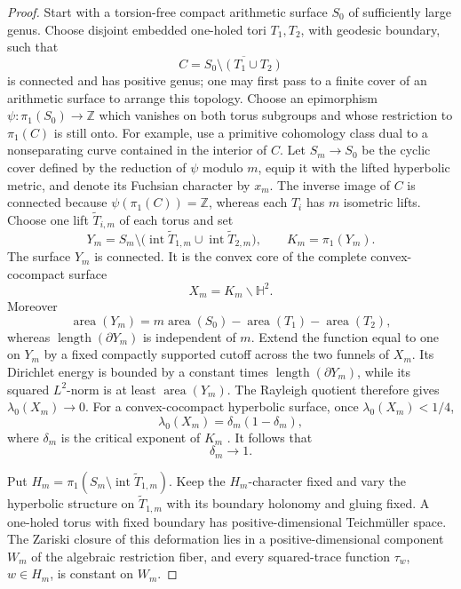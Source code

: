 \documentclass[11pt,reqno]{amsart}
\theoremstyle{definition}
\theoremstyle{remark}
\newcommand{\Z}{\mathbb Z}
\begin{document}
\begin{proof}
Start with a torsion-free compact arithmetic surface \(S_0\) of sufficiently
large genus.  Choose disjoint embedded one-holed tori \(T_1,T_2\), with
geodesic boundary, such that
\[
 C=\overline{S_0\setminus(T_1\cup T_2)}
\]
is connected and has positive genus; one may first pass to a finite cover of
an arithmetic surface to arrange this topology.  Choose an epimorphism
\(\psi\colon\pi_1(S_0)\to\Z\) which vanishes on both torus subgroups and whose
restriction to \(\pi_1(C)\) is still onto.  For example, use a primitive
cohomology class dual to a nonseparating curve contained in the interior of
\(C\).  Let \(S_m\to S_0\) be the cyclic cover defined by the reduction of
\(\psi\) modulo \(m\), equip it with the lifted hyperbolic metric, and denote
its Fuchsian character by \(x_m\).  The inverse image of \(C\) is connected because
\(\psi(\pi_1(C))=\Z\), whereas each \(T_i\) has \(m\) isometric lifts.  Choose
one lift \(\widetilde T_{i,m}\) of each torus and set
\[
 Y_m=S_m\setminus\bigl(\operatorname{int}\widetilde T_{1,m}
                   \cup\operatorname{int}\widetilde T_{2,m}\bigr),
 \qquad K_m=\pi_1(Y_m).
\]
The surface \(Y_m\) is connected.  It is the convex core of the complete
convex-cocompact surface
\[
 X_m=K_m\backslash\mathbb H^2.
\]
Moreover
\[
 \operatorname{area}(Y_m)
 =m\operatorname{area}(S_0)-\operatorname{area}(T_1)-\operatorname{area}(T_2),
\]
whereas \(\operatorname{length}(\partial Y_m)\) is independent of \(m\).
Extend the function equal to one on \(Y_m\) by a fixed compactly supported
cutoff across the two funnels of \(X_m\).  Its Dirichlet energy is bounded by
a constant times \(\operatorname{length}(\partial Y_m)\), while its squared
\(L^2\)-norm is at least \(\operatorname{area}(Y_m)\).  The Rayleigh quotient
therefore gives \(\lambda_0(X_m)\to0\).  For a convex-cocompact hyperbolic
surface, once \(\lambda_0(X_m)<1/4\),
\[
 \lambda_0(X_m)=\delta_m(1-\delta_m),
\]
where \(\delta_m\) is the critical exponent of \(K_m\)
\cite{BorthwickSpectral}.  It follows that
\[
 \delta_m\longrightarrow1.
\]

Put
\(H_m=\pi_1(S_m\setminus\operatorname{int}\widetilde T_{1,m})\).  Keep the
\(H_m\)-character fixed and vary the hyperbolic structure on
\(\widetilde T_{1,m}\) with
its boundary holonomy and gluing fixed.  A one-holed torus with fixed
boundary has positive-dimensional Teichm\"uller space.  The Zariski closure
of this deformation lies in a positive-dimensional component \(W_m\) of
the algebraic restriction fiber, and every squared-trace function
\(\tau_w\), \(w\in H_m\), is constant on \(W_m\).


\end{proof}
\end{document}
